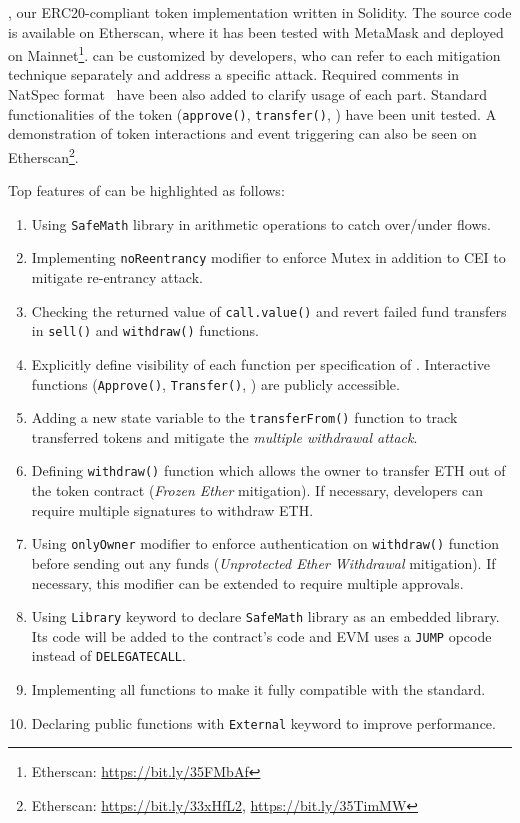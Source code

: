 \sys, our ERC20-compliant token implementation written in Solidity. The source code is available on Etherscan, where it has been tested with MetaMask and deployed on Mainnet\footnote{Etherscan: \url{https://bit.ly/35FMbAf}}. \sys can be customized by developers, who can refer to each mitigation technique separately and address a specific attack. Required comments in NatSpec format~\cite{NatSpec} have been also added to clarify usage of each part. Standard functionalities of the token (\ie \texttt{approve()}, \texttt{transfer()}, \etc) have been unit tested. A demonstration of token interactions and event triggering can also be seen on Etherscan\footnote{Etherscan: \url{https://bit.ly/33xHfL2}, \url{https://bit.ly/35TimMW}}. {\blue Top features of \sys can be highlighted as follows:
\begin{enumerate}[noitemsep,topsep=0pt]
	\item Using \texttt{SafeMath} library in arithmetic operations to catch over/under flows.
	\item Implementing \texttt{noReentrancy} modifier to enforce Mutex in addition to CEI to mitigate re-entrancy attack.
	\item Checking the returned value of \texttt{call.value()} and revert failed fund transfers in \texttt{sell()} and \texttt{withdraw()} functions.
	\item Explicitly define visibility of each function per specification of \erc. Interactive functions (\eg \texttt{Approve()}, \texttt{Transfer()}, \etc) are publicly accessible.
	\item Adding a new state variable to the \texttt{transferFrom()} function to track transferred tokens and mitigate the \textit{multiple withdrawal attack}. 
	\item Defining \texttt{withdraw()} function which allows the owner to transfer ETH out of the token contract (\textit{Frozen Ether} mitigation). If necessary, developers can require multiple signatures to withdraw ETH.
	\item Using \texttt{onlyOwner} modifier to enforce authentication on \texttt{withdraw()} function before sending out any funds (\textit{Unprotected Ether Withdrawal} mitigation). If necessary, this modifier can be extended to require multiple approvals.
	\item Using \texttt{Library} keyword to declare \texttt{SafeMath} library as an embedded library. Its code will be added to the \erc contract's code and EVM uses a \texttt{JUMP} opcode instead of \texttt{DELEGATECALL}.
	\item Implementing all functions to make it fully compatible with the standard.
	\item Declaring public functions with \texttt{External} keyword to improve performance.
\end{enumerate}

}

